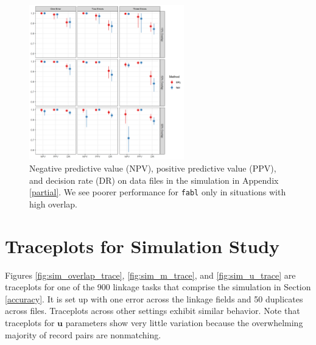 \documentclass[ba]{imsart}
\begin{document}


\begin{figure}[t]
	\begin{center}
		\includegraphics[width=0.6\textwidth]{../notes/figures/sadinle_sim_plot_partial_DR} 
		\caption{Negative predictive value (NPV), positive predictive value (PPV), and decision rate (DR) on data files in the simulation in Appendix \ref{partial}. We see poorer performance for \texttt{fabl} only in situations with high overlap.}
		\label{fig:sadinle_simulation_partial}
	\end{center}
\end{figure}
	
	
	\hypertarget{appendix-sim}{%
		\section{Traceplots for Simulation Study}\label{app:appendix-sim}}
	Figures \ref{fig:sim_overlap_trace}, \ref{fig:sim_m_trace}, and \ref{fig:sim_u_trace} are traceplots for one of the 900 linkage tasks that comprise the simulation in Section \ref{accuracy}. It is set up with one error across the linkage fields and 50 duplicates across files. Traceplots across other settings exhibit similar behavior. Note that traceplots for $\bm{u}$ parameters show very little variation because the overwhelming majority of record pairs are nonmatching.  
	
\end{document}

